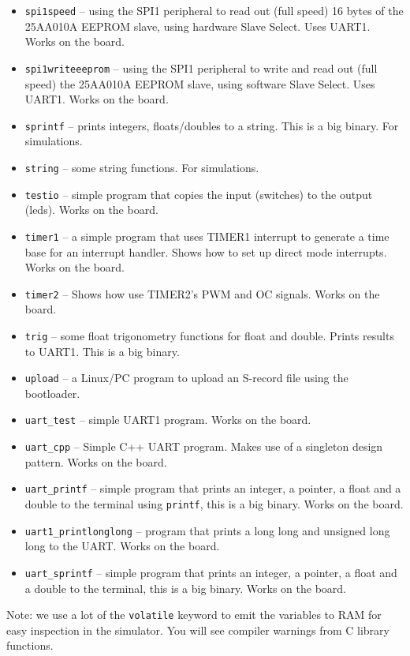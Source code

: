 \documentclass[12pt]{article}
\begin{document}
\begin{itemize}
\item \lstinline|spi1speed| -- using the SPI1 peripheral to read out (full speed) 16 bytes of the 25AA010A EEPROM slave, using hardware Slave Select. Uses UART1. Works on the board.
\item \lstinline|spi1writeeeprom| -- using the SPI1 peripheral to write and read out (full speed) the 25AA010A EEPROM slave, using software Slave Select. Uses UART1. Works on the board.
\item \lstinline|sprintf| -- prints integers, floats/doubles to a string. This is a big binary. For simulations.
\item \lstinline|string| -- some string functions. For simulations.
\item \lstinline|testio| -- simple program that copies the input (switches) to the output (leds). Works on the board.
\item \lstinline|timer1| -- a simple program that uses TIMER1 interrupt to generate a time base for an interrupt handler. Shows how to set up direct mode interrupts. Works on the board.
\item \lstinline|timer2| -- Shows how use TIMER2's PWM and OC signals. Works on the board.
\item \lstinline|trig| -- some float trigonometry functions for float and double. Prints results to UART1. This is a big binary.
\item \lstinline|upload| -- a Linux/PC program to upload an S-record file using the bootloader.
\item \lstinline|uart_test| -- simple UART1 program. Works on the board.
\item \lstinline|uart_cpp| -- Simple C++ UART program. Makes use of a singleton design pattern. Works on the board.
\item \lstinline|uart_printf| -- simple program that prints an integer, a pointer, a float and a double to the terminal using \lstinline|printf|, this is a big binary. Works on the board.
\item \lstinline|uart1_printlonglong| -- program that prints a long long and unsigned long long to the UART. Works on the board.
\item \lstinline|uart_sprintf| -- simple program that prints an integer, a pointer, a float and a double to the terminal, this is a big binary. Works on the board.
\end{itemize} 

Note: we use a lot of the \lstinline|volatile| keyword to emit the variables to RAM for easy inspection in the simulator. You will see compiler warnings from C library functions.
\end{document}
